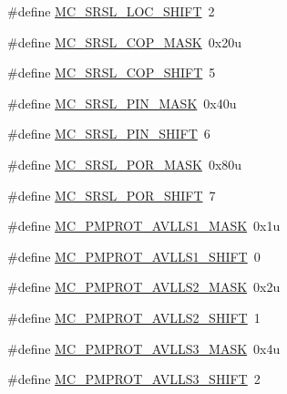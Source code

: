 \begin{DoxyCompactItemize}
\item 
\#define \hyperlink{group___m_c___register___masks_ga0519f1e6dd4ac23c7ed8fcf3695051d2}{M\+C\+\_\+\+S\+R\+S\+L\+\_\+\+L\+O\+C\+\_\+\+S\+H\+I\+FT}~2
\item 
\#define \hyperlink{group___m_c___register___masks_gadd96d87536ac689bd56d157e5d45c76e}{M\+C\+\_\+\+S\+R\+S\+L\+\_\+\+C\+O\+P\+\_\+\+M\+A\+SK}~0x20u
\item 
\#define \hyperlink{group___m_c___register___masks_gaa3635723882078e2c22f01234628e6e3}{M\+C\+\_\+\+S\+R\+S\+L\+\_\+\+C\+O\+P\+\_\+\+S\+H\+I\+FT}~5
\item 
\#define \hyperlink{group___m_c___register___masks_ga0ccc34dcb4e3631fdfb94a1144704235}{M\+C\+\_\+\+S\+R\+S\+L\+\_\+\+P\+I\+N\+\_\+\+M\+A\+SK}~0x40u
\item 
\#define \hyperlink{group___m_c___register___masks_ga52d8106fc971c14fa8628c3c592f7707}{M\+C\+\_\+\+S\+R\+S\+L\+\_\+\+P\+I\+N\+\_\+\+S\+H\+I\+FT}~6
\item 
\#define \hyperlink{group___m_c___register___masks_ga312bf4b36b5283bf17037a92ad2d8eca}{M\+C\+\_\+\+S\+R\+S\+L\+\_\+\+P\+O\+R\+\_\+\+M\+A\+SK}~0x80u
\item 
\#define \hyperlink{group___m_c___register___masks_ga6cb35cd7df388c52ff63ff99e274f612}{M\+C\+\_\+\+S\+R\+S\+L\+\_\+\+P\+O\+R\+\_\+\+S\+H\+I\+FT}~7
\item 
\#define \hyperlink{group___m_c___register___masks_ga883acef215765c6e5b7c77f596be05f4}{M\+C\+\_\+\+P\+M\+P\+R\+O\+T\+\_\+\+A\+V\+L\+L\+S1\+\_\+\+M\+A\+SK}~0x1u
\item 
\#define \hyperlink{group___m_c___register___masks_ga4de8174a50aee767588c0550f39d74a0}{M\+C\+\_\+\+P\+M\+P\+R\+O\+T\+\_\+\+A\+V\+L\+L\+S1\+\_\+\+S\+H\+I\+FT}~0
\item 
\#define \hyperlink{group___m_c___register___masks_ga401dddedf77ed34c8829d542bec38033}{M\+C\+\_\+\+P\+M\+P\+R\+O\+T\+\_\+\+A\+V\+L\+L\+S2\+\_\+\+M\+A\+SK}~0x2u
\item 
\#define \hyperlink{group___m_c___register___masks_gaa52097c2663ad04f54455e87668f25ec}{M\+C\+\_\+\+P\+M\+P\+R\+O\+T\+\_\+\+A\+V\+L\+L\+S2\+\_\+\+S\+H\+I\+FT}~1
\item 
\#define \hyperlink{group___m_c___register___masks_ga9df967c9d484bfb27ed78aab09341ddd}{M\+C\+\_\+\+P\+M\+P\+R\+O\+T\+\_\+\+A\+V\+L\+L\+S3\+\_\+\+M\+A\+SK}~0x4u
\item 
\#define \hyperlink{group___m_c___register___masks_gaf9f58665458bc923a6779ea37bd71908}{M\+C\+\_\+\+P\+M\+P\+R\+O\+T\+\_\+\+A\+V\+L\+L\+S3\+\_\+\+S\+H\+I\+FT}~2

\end{DoxyCompactItemize}
